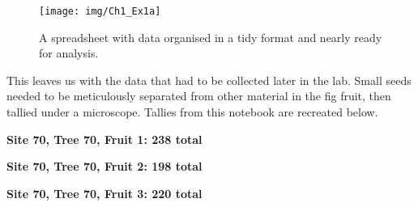 \documentclass[
  openany]{scrbook}
\begin{document}
\begin{figure}
\texttt{[image: img/Ch1\_Ex1a]} \caption{A spreadsheet with data organised in a tidy format and nearly ready for analysis.}\label{fig:unnamed-chunk-11}
\end{figure}

This leaves us with the data that had to be collected later in the lab.
Small seeds needed to be meticulously separated from other material in the fig fruit, then tallied under a microscope. Tallies from this notebook are recreated below.

\textbf{Site 70, Tree 70, Fruit 1: 238 total}

\StrokeFive\StrokeFive\StrokeFive\StrokeFive\StrokeFive\StrokeFive\StrokeFive\StrokeFive\StrokeFive\StrokeFive\StrokeFive\StrokeFive\StrokeFive\StrokeFive\StrokeFive\StrokeFive\StrokeFive\StrokeFive\StrokeFive\StrokeFive

\StrokeFive\StrokeFive\StrokeFive\StrokeFive\StrokeFive\StrokeFive\StrokeFive\StrokeFive\StrokeFive\StrokeFive\StrokeFive\StrokeFive\StrokeFive\StrokeFive\StrokeFive\StrokeFive\StrokeFive\StrokeFive\StrokeFive\StrokeFive

\StrokeFive\StrokeFive\StrokeFive\StrokeFive\StrokeFive\StrokeFive\StrokeFive\StrokeThree

\textbf{Site 70, Tree 70, Fruit 2: 198 total}

\StrokeFive\StrokeFive\StrokeFive\StrokeFive\StrokeFive\StrokeFive\StrokeFive\StrokeFive\StrokeFive\StrokeFive\StrokeFive\StrokeFive\StrokeFive\StrokeFive\StrokeFive\StrokeFive\StrokeFive\StrokeFive\StrokeFive\StrokeFive

\StrokeFive\StrokeFive\StrokeFive\StrokeFive\StrokeFive\StrokeFive\StrokeFive\StrokeFive\StrokeFive\StrokeFive\StrokeFive\StrokeFive\StrokeFive\StrokeFive\StrokeFive\StrokeFive\StrokeFive\StrokeFive\StrokeFive\StrokeThree

\textbf{Site 70, Tree 70, Fruit 3: 220 total}

\StrokeFive\StrokeFive\StrokeFive\StrokeFive\StrokeFive\StrokeFive\StrokeFive\StrokeFive\StrokeFive\StrokeFive\StrokeFive\StrokeFive\StrokeFive\StrokeFive\StrokeFive\StrokeFive\StrokeFive\StrokeFive\StrokeFive\StrokeFive

\StrokeFive\StrokeFive\StrokeFive\StrokeFive\StrokeFive\StrokeFive\StrokeFive\StrokeFive\StrokeFive\StrokeFive\StrokeFive\StrokeFive\StrokeFive\StrokeFive\StrokeFive\StrokeFive\StrokeFive\StrokeFive\StrokeFive\StrokeFive

\StrokeFive\StrokeFive\StrokeFive\StrokeFive
\end{document}
